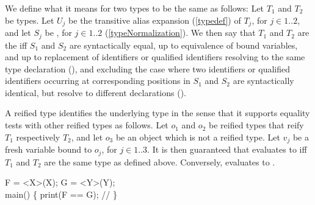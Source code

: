 \documentclass[makeidx]{article}
\begin{document}
{\LMHash{}%
We define what it means for two types to be the same as follows:
Let $T_1$ and $T_2$ be types.
Let $U_j$ be the transitive alias expansion
(\ref{typedef}) of $T_j$, for $j \in 1 .. 2$,
and let $S_j$ be , for $j \in 1 .. 2$
(\ref{typeNormalization}).
We then say that $T_1$ and $T_2$ are the 
if{}f $S_1$ and $S_2$ are syntactically equal,
up to equivalence of bound variables,
and up to replacement of identifiers or qualified identifiers
resolving to the same type declaration
(),
and excluding the case where two identifiers or qualified identifiers
occurring at corresponding positions in $S_1$ and $S_2$
are syntactically identical,
but resolve to different declarations
().

\LMHash{}%
A reified type identifies the underlying type in the sense that
it supports equality tests with other reified types as follows.
Let $o_1$ and $o_2$ be reified types that reify $T_1$ respectively $T_2$,
and let $o_3$ be an object which is not a reified type.
Let $v_j$ be a fresh variable bound to $o_j$, for $j \in 1 .. 3$.
It is then guaranteed that  evaluates to \TRUE{}
if{}f $T_1$ and $T_2$ are the same type as defined above.
Conversely,  evaluates to \FALSE.


\begin{dartCode}
\TYPEDEF{} F = \VOID{} \FUNCTION{}<X>(X);
\TYPEDEF{} G = \VOID{} \FUNCTION{}<Y>(Y);
\\
\VOID{} main() \{
  print(F == G); // 
\}
\end{dartCode}


}
\end{document}
